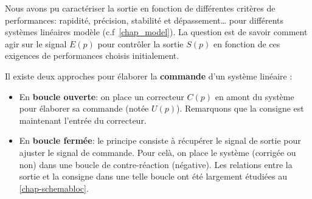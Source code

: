 Nous avons pu caractériser la sortie en fonction de différentes 
critères de performances: rapidité, précision, stabilité et dépassement\ldots
pour différents systèmes linéaires modèle (c.f~\cref{chap_model}). 
La question est de savoir comment agir sur le 
signal $E(p)$ pour contrôler la sortie $S(p)$ en fonction de 
ces exigences de performances choisis initialement.

Il existe deux approches pour élaborer la \textbf{commande} 
d'un système linéaire :%

\begin{itemize}
    \item En \textbf{boucle ouverte}: on place un correcteur $C(p)$
          en amont du système pour élaborer 
          sa commande (notée $U(p)$).
          Remarquons que la consigne est maintenant
          l'entrée du correcteur.

%                                      
%                                      
%
\begin{center}
\end{center}

    \item En \textbf{boucle fermée}: le principe consiste à récupérer 
          le signal de sortie pour ajuster le signal de commande. 
          Pour celà, on place le système (corrigée ou non) dans une 
          boucle de contre-réaction (négative). 
          Les relations entre la sortie et la consigne dans une telle 
          boucle ont été largement étudiées au \cref{chap-schemabloc}.


\end{itemize}
